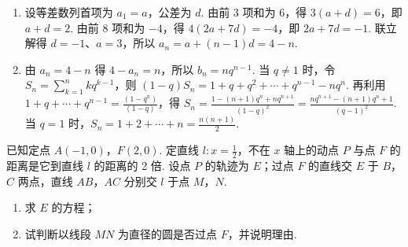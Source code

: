 \begin{solution}
\begin{enumerate}
\item 设等差数列首项为 \(a_1=a\)，公差为 \(d\). 由前 \(3\) 项和为 \(6\)，得 \(3(a+d)=6\)，即 \(a+d=2\). 由前 \(8\) 项和为 \(-4\)，得 \(4(2a+7d)=-4\)，即 \(2a+7d=-1\). 联立解得 \(d=-1\)、\(a=3\)，所以 \(a_n=a+(n-1)d=4-n\).
\item 由 \(a_n=4-n\) 得 \(4-a_n=n\)，所以 \(b_n=nq^{n-1}\). 当 \(q\ne1\) 时，令 \(S_n=\sum_{k=1}^n kq^{k-1}\)，则
\((1-q)S_n=1+q+q^2+\cdots+q^{n-1}-nq^n\).
再利用 \(1+q+\cdots+q^{n-1}=\frac{(1-q^n)}{(1-q)}\)，得
\(S_n=\frac{1-(n+1)q^n+nq^{n+1}}{(1-q)^2}=\frac{nq^{n+1}-(n+1)q^n+1}{(q-1)^2}\).
当 \(q=1\) 时，\(S_n=1+2+\cdots+n=\frac{n(n+1)}2\).
\end{enumerate}
\end{solution}

\begin{problem}
已知定点 \(A(-1,0)\)，\(F(2,0)\). 定直线 \(l: x = \frac{1}{2}\)，不在 \(x\) 轴上的动点 \(P\) 与点 \(F\) 的距离是它到直线 \(l\) 的距离的 2 倍. 设点 \(P\) 的轨迹为 \(E\)；过点 \(F\) 的直线交 \(E\) 于 \(B\)，\(C\) 两点，直线 \(AB\)，\(AC\) 分别交 \(l\) 于点 \(M\)，\(N\).

\begin{enumerate}
\item 求 \(E\) 的方程；
\item 试判断以线段 \(MN\) 为直径的圆是否过点 \(F\)，并说明理由.
\end{enumerate}
\end{problem}

